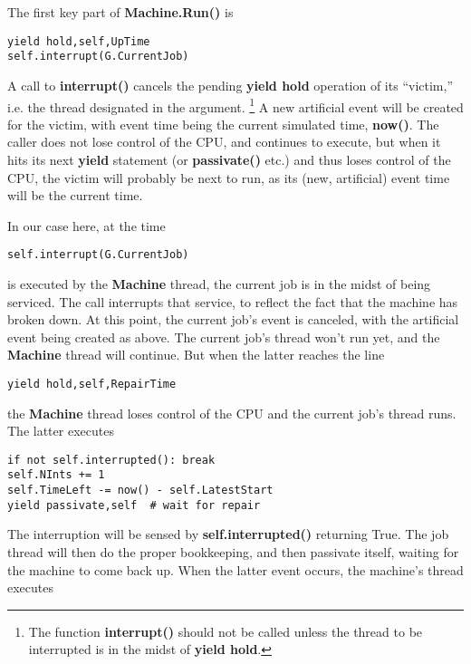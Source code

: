 \documentclass[11pt]{article}
\begin{document}
The first key part of {\bf Machine.Run()} is

\begin{Verbatim}[fontsize=\relsize{-2}]
yield hold,self,UpTime
self.interrupt(G.CurrentJob)
\end{Verbatim}

A call to {\bf interrupt()} cancels the pending {\bf yield hold}
operation of its ``victim,'' i.e. the thread designated in the argument.
\footnote{The function {\bf interrupt()} should not be called unless the
thread to be interrupted is in the midst of {\bf yield hold}.} A new
artificial event will be created for the victim, with event time being
the current simulated time, {\bf now()}.  The caller does not lose
control of the CPU, and continues to execute, but when it hits its next
{\bf yield} statement (or {\bf passivate()} etc.) and thus loses control
of the CPU, the victim will probably be next to run, as its (new,
artificial) event time will be the current time.

In our case here, at the time 

\begin{Verbatim}[fontsize=\relsize{-2}]
self.interrupt(G.CurrentJob)
\end{Verbatim}

is executed by the {\bf Machine} thread, the current job is in the midst
of being serviced.  The call interrupts that service, to reflect the
fact that the machine has broken down.  At this point, the current job's
event is canceled, with the artificial event being created as above.
The current job's thread won't run yet, and the {\bf Machine} thread
will continue.  But when the latter reaches the line

\begin{Verbatim}[fontsize=\relsize{-2}]
yield hold,self,RepairTime
\end{Verbatim}

the {\bf Machine} thread loses control of the CPU and the current job's
thread runs.  The latter executes

\begin{Verbatim}[fontsize=\relsize{-2}]
if not self.interrupted(): break
self.NInts += 1
self.TimeLeft -= now() - self.LatestStart
yield passivate,self  # wait for repair
\end{Verbatim}

The interruption will be sensed by {\bf self.interrupted()} returning
True.  The job thread will then do the proper bookkeeping, and then
passivate itself, waiting for the machine to come back up.  When the
latter event occurs, the machine's thread executes
\end{document}
